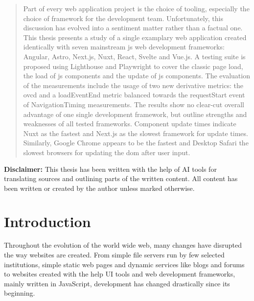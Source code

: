\documentclass[a4paper, 12pt]{article}
\providecommand{\keywords}[1]
{
  {
    \footnotesize
    \textit{\textbf{Keywords ---} #1}
  } 
}
\begin{document}
\begin{abstract}
  Part of every web application project is the choice of tooling, especially the choice of framework for the development team.
  Unfortunately, this discussion has evolved into a sentiment matter rather than a factual one.
  This thesis presents a study of a single examplary web application created identically with seven mainstream \acrlong{js} web development frameworks: Angular, Astro, Next.js, Nuxt, React, Svelte and Vue.js.
  A testing suite is proposed using Lighthouse and Playwright to cover the classic page load, the load of \acrlong{js} components and the update of \acrlong{js} components.
  The evaluation of the measurements include the usage of two new derivative metrics: the \acrfull{ovcd} and a loadEventEnd metric balanced towards the requestStart event of NavigationTiming measurements.
  The results show no clear-cut overall advantage of one single development framework, but outline strengths and weaknesses of all tested frameworks.
  Component update times indicate Nuxt as the fastest and Next.js as the slowest framework for update times.
  Similarly, Google Chrome appears to be the fastest and Desktop Safari the slowest browsers for updating the \acrshort{dom} after user input. 
\end{abstract}


\vfill

\noindent\textbf{Disclaimer:} This thesis has been written with the help of AI tools for translating sources and outlining parts of the written content.
All content has been written or created by the author unless marked otherwise.

\pagebreak

\tableofcontents
\pagebreak

\section{Introduction}\label{sec:introduction}
Throughout the evolution of the world wide web, many changes have disrupted the way websites are created.
From simple file servers run by few selected institutions, simple static web pages and dynamic services like blogs and forums to websites created with the help UI tools and web development frameworks, mainly written in JavaScript, development has changed drastically since its beginning.
\end{document}
